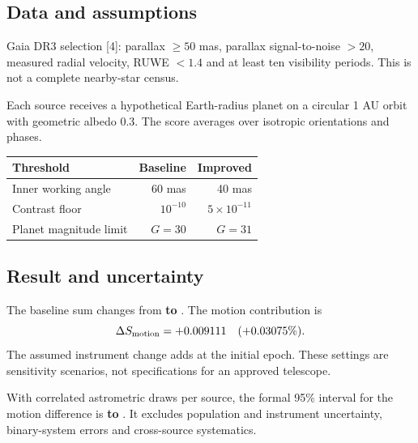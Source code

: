 \begin{minipage}[t]{.485\linewidth}\vspace{0pt}\setlength{\parskip}{3pt}
\subsection*{Data and assumptions}
Gaia DR3 selection [4]: parallax $\geq50$ mas, parallax signal-to-noise $>20$, measured radial velocity, RUWE $<1.4$ and at least ten visibility periods. This is not a complete nearby-star census.

Each source receives a hypothetical Earth-radius planet on a circular 1 AU orbit with geometric albedo 0.3. The score averages over isotropic orientations and phases.

\small\begin{tabularx}{\linewidth}{@{}Xrr@{}}\toprule
Threshold & Baseline & Improved\\\midrule
Inner working angle & 60 mas & 40 mas\\
Contrast floor & $10^{-10}$ & $5\!\times\!10^{-11}$\\
Planet magnitude limit & $G=30$ & $G=31$\\\bottomrule
\end{tabularx}\par\vspace{4pt}\normalsize
\end{minipage}\hfill
\begin{minipage}[t]{.485\linewidth}\vspace{0pt}\setlength{\parskip}{3pt}
\subsection*{Result and uncertainty}
The baseline sum changes from \textbf{\ReportBaselineInitial{} to \ReportBaselineFuture{}}. The motion contribution is
\[
 \Delta S_{\mathrm{motion}}=+0.009111\quad(+0.03075\%).
\]
The assumed instrument change adds \textbf{\ReportInstrumentScore{}} at the initial epoch. These settings are sensitivity scenarios, not specifications for an approved telescope.

With \ReportDraws{} correlated astrometric draws per source, the formal 95\% interval for the motion difference is \textbf{\ReportMotionLow{} to \ReportMotionHigh{}}. It excludes population and instrument uncertainty, binary-system errors and cross-source systematics.
\end{minipage}

